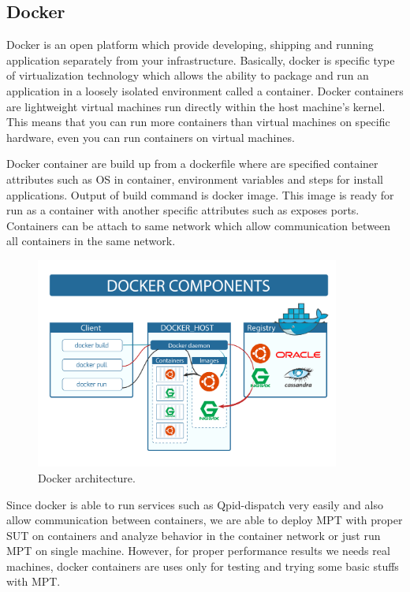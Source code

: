 \subsection{Docker}
Docker \cite{Docker} is an open platform which provide developing, shipping and running application separately from your infrastructure. Basically, docker is specific type of virtualization technology which allows the ability to package and run an application in a loosely isolated environment called a container. Docker containers are lightweight virtual machines run directly within the host machine's kernel. This means that you can run more containers than virtual machines on specific hardware, even you can run containers on virtual machines. 

Docker container are build up from a dockerfile where are specified container attributes such as OS in container, environment variables and steps for install applications. Output of build command is docker image. This image is ready for run as a container with another specific attributes such as exposes ports. Containers can be attach to same network which allow communication between all containers in the same network.

\begin{figure}[H]
  \centering
  \includegraphics[width=10cm]{obrazky-figures/docker.png}
  \caption{Docker architecture. }
  \label{fig:ansible_architecture}
\end{figure}


Since docker is able to run services such as Qpid-dispatch very easily and also allow communication between containers, we are able to deploy MPT with proper SUT on containers and analyze behavior in the container network or just run MPT on single machine. However, for proper performance results we needs real machines, docker containers are uses only for testing and trying some basic stuffs with MPT.


